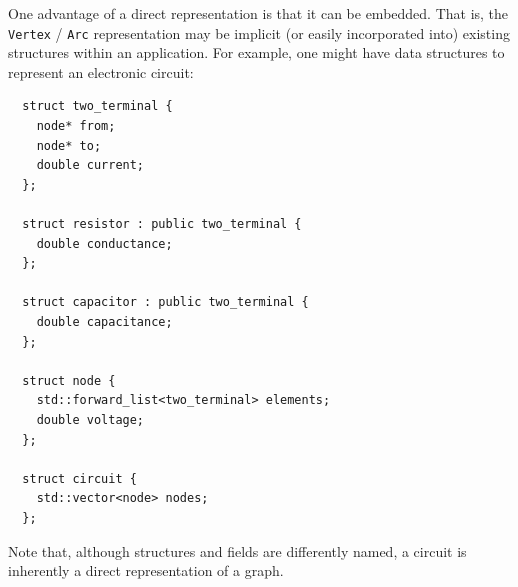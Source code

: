 One advantage of a direct representation is that it can be embedded.  That is, the \lstinline{Vertex} / \lstinline{Arc} representation may be implicit (or easily incorporated into) existing structures within an application.  For example,
one might have data structures to represent an electronic circuit:
\begin{lstlisting}
  struct two_terminal {
    node* from;
    node* to;
    double current;
  };

  struct resistor : public two_terminal {
    double conductance;
  };

  struct capacitor : public two_terminal {
    double capacitance;
  };

  struct node {
    std::forward_list<two_terminal> elements;
    double voltage;
  };

  struct circuit {
    std::vector<node> nodes;
  };
\end{lstlisting}
Note that, although structures and fields are differently named, a circuit is inherently a direct representation of a graph.







